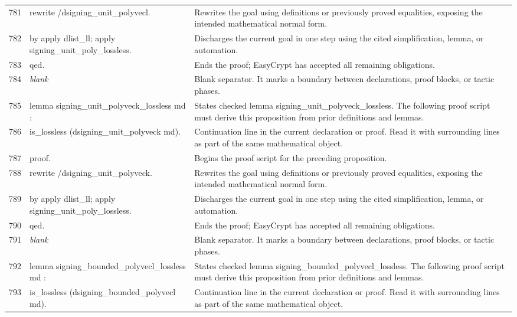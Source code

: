 \documentclass[10pt]{article}
\begin{document}
\begin{longtable}{r L{0.53\textwidth} L{0.37\textwidth}}
781 & {\ttfamily\scriptsize rewrite /dsigning\_unit\_polyvecl.} & Rewrites the goal using definitions or previously proved equalities, exposing the intended mathematical normal form. \\
782 & {\ttfamily\scriptsize by apply dlist\_ll; apply signing\_unit\_poly\_lossless.} & Discharges the current goal in one step using the cited simplification, lemma, or automation. \\
783 & {\ttfamily\scriptsize qed.} & Ends the proof; EasyCrypt has accepted all remaining obligations. \\
784 & {\ttfamily\scriptsize \emph{blank}} & Blank separator.  It marks a boundary between declarations, proof blocks, or tactic phases. \\
785 & {\ttfamily\scriptsize lemma signing\_unit\_polyveck\_lossless md :} & States checked lemma signing\_unit\_polyveck\_lossless.  The following proof script must derive this proposition from prior definitions and lemmas. \\
786 & {\ttfamily\scriptsize   is\_lossless (dsigning\_unit\_polyveck md).} & Continuation line in the current declaration or proof.  Read it with surrounding lines as part of the same mathematical object. \\
787 & {\ttfamily\scriptsize proof.} & Begins the proof script for the preceding proposition. \\
788 & {\ttfamily\scriptsize rewrite /dsigning\_unit\_polyveck.} & Rewrites the goal using definitions or previously proved equalities, exposing the intended mathematical normal form. \\
789 & {\ttfamily\scriptsize by apply dlist\_ll; apply signing\_unit\_poly\_lossless.} & Discharges the current goal in one step using the cited simplification, lemma, or automation. \\
790 & {\ttfamily\scriptsize qed.} & Ends the proof; EasyCrypt has accepted all remaining obligations. \\
791 & {\ttfamily\scriptsize \emph{blank}} & Blank separator.  It marks a boundary between declarations, proof blocks, or tactic phases. \\
792 & {\ttfamily\scriptsize lemma signing\_bounded\_polyvecl\_lossless md :} & States checked lemma signing\_bounded\_polyvecl\_lossless.  The following proof script must derive this proposition from prior definitions and lemmas. \\
793 & {\ttfamily\scriptsize   is\_lossless (dsigning\_bounded\_polyvecl md).} & Continuation line in the current declaration or proof.  Read it with surrounding lines as part of the same mathematical object. \\

\end{longtable}
\end{document}

